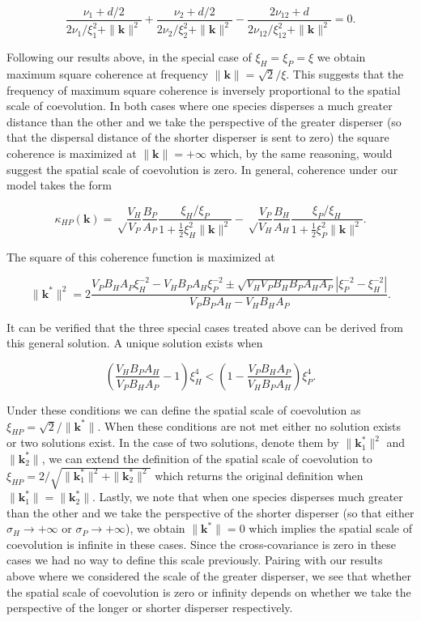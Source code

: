 \documentclass{article}
\begin{document}
\[\frac{\nu_1+d/2}{2\nu_1/\xi_1^2+\|\pmb k\|^2}+\frac{\nu_2+d/2}{2\nu_2/\xi_2^2+\|\pmb k\|^2}-\frac{2\nu_{12}+d}{2\nu_{12}/\xi_{12}^2+\|\pmb k\|^2}=0.\]

Following our results above, in the special case of \(\xi_H=\xi_P=\xi\)
we obtain maximum square coherence at frequency
\(\|\pmb k\|=\sqrt2/\xi\). This suggests that the frequency of maximum
square coherence is inversely proportional to the spatial scale of
coevolution. In both cases where one species disperses a much greater
distance than the other and we take the perspective of the greater
disperser (so that the dispersal distance of the shorter disperser is
sent to zero) the square coherence is maximized at
\(\|\pmb k\|=+\infty\) which, by the same reasoning, would suggest the
spatial scale of coevolution is zero. In general, coherence under our
model takes the form

\[\kappa_{HP}(\pmb k)=\sqrt\frac{V_H}{V_P}\frac{B_P}{A_P}\frac{\xi_H/\xi_P}{1+\tfrac{1}{2}\xi_H^2\|\pmb k\|^2}-\sqrt\frac{V_P}{V_H}\frac{B_H}{A_H}\frac{\xi_P/\xi_H}{1+\tfrac{1}{2}\xi_P^2\|\pmb k\|^2}.\]

The square of this coherence function is maximized at

\[\|\pmb k^*\|^2=2\frac{V_PB_HA_P\xi_H^{-2}-V_HB_PA_H\xi_P^{-2}\pm\sqrt{V_HV_PB_HB_PA_HA_P}|\xi_P^{-2}-\xi_H^{-2}|}{V_PB_PA_H-V_HB_HA_P}.\]

It can be verified that the three special cases treated above can be
derived from this general solution. A unique solution exists when

\[\left(\frac{V_HB_PA_H}{V_PB_HA_P}-1\right)\xi_H^4<\left(1-\frac{V_PB_HA_P}{V_HB_PA_H}\right)\xi_P^4.\]

Under these conditions we can define the spatial scale of coevolution as
\(\xi_{HP}=\sqrt2/\|\pmb k^*\|\). When these conditions are not met
either no solution exists or two solutions exist. In the case of two
solutions, denote them by \(\|\pmb k_1^*\|^2\) and \(\|\pmb k_2^*\|\),
we can extend the definition of the spatial scale of coevolution to
\(\xi_{HP}=2/\sqrt{\|\pmb k_1^*\|^2+\|\pmb k_2^*\|^2}\) which returns
the original definition when \(\|\pmb k_1^*\|=\|\pmb k_2^*\|\). Lastly,
we note that when one species disperses much greater than the other and
we take the perspective of the shorter disperser (so that either
\(\sigma_H\to+\infty\) or \(\sigma_P\to+\infty\)), we obtain
\(\|\pmb k^*\|=0\) which implies the spatial scale of coevolution is
infinite in these cases. Since the cross-covariance is zero in these
cases we had no way to define this scale previously. Pairing with our
results above where we considered the scale of the greater disperser, we
see that whether the spatial scale of coevolution is zero or infinity
depends on whether we take the perspective of the longer or shorter
disperser respectively.
\end{document}
